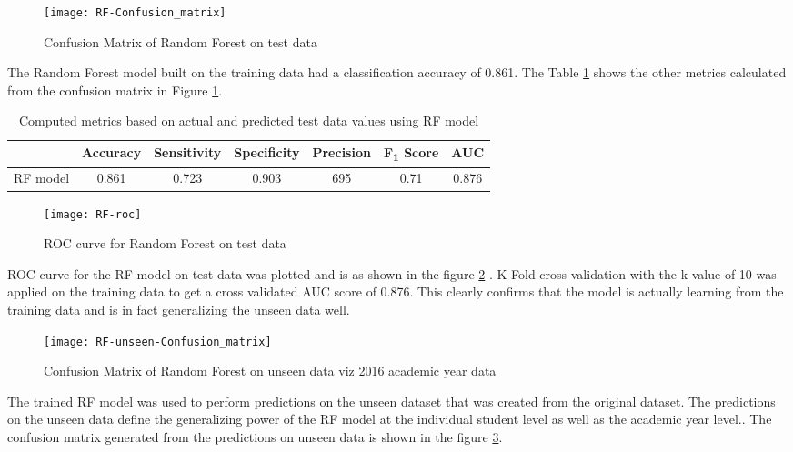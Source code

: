 \documentclass[11pt,openright]{report}
\begin{document}
  \begin{figure}[!htb]
	\centering
	\texttt{[image: RF-Confusion\_matrix]}
	\caption{Confusion Matrix of Random Forest on test data}
	\label{fig:RF_confusion_matrix}
\end{figure} 

The Random Forest model built on the training data had a classification accuracy of 0.861. The Table \ref{table:RF_confusion_matrix} shows the other metrics calculated from the confusion matrix in Figure \ref{fig:RF_confusion_matrix}. 
\begin{table}[!htb]
	\renewcommand{\arraystretch}{1.3}
	\caption{Computed metrics based on actual and predicted test data values using RF model}
	\label{table:RF_confusion_matrix}
	\centering
	\begin{tabular}{|c|c|c|c|c|c|c|}
    \hline
  	 & \bfseries Accuracy & \bfseries Sensitivity & \bfseries Specificity & \bfseries Precision & \bfseries F\textsubscript{1} Score  & \bfseries AUC\\  
    \hline
	RF model & 0.861 & 0.723 & 0.903 & 695 & 0.71 & 0.876 \\ \hline
	\end{tabular} 
\end{table}

 \begin{figure}[!htb]
	\centering
	\texttt{[image: RF-roc]}
	\caption{ROC curve for Random Forest on test data}
	\label{fig:RF_roc}
\end{figure} 

ROC curve for the RF model on test data was plotted and is as shown in the figure \ref{fig:RF_roc} . K-Fold cross validation with the k value of 10 was applied on the training data to get a cross validated AUC score of 0.876. This clearly confirms that the model is actually learning from the training data and is in fact generalizing the unseen data well.

  \begin{figure}[!htb]
	\centering
	\texttt{[image: RF-unseen-Confusion\_matrix]}
	\caption{Confusion Matrix of Random Forest on unseen data viz 2016 academic year data}
	\label{fig:RF_unseen_confusion_matrix}
\end{figure} 


The trained RF model was used to perform predictions on the unseen dataset that was created from the original dataset. The predictions on the unseen data define the generalizing power of the RF model at the individual student level as well as the academic year level.. The confusion matrix generated from the predictions on unseen data is shown in the figure \ref{fig:RF_unseen_confusion_matrix}.
\end{document}
